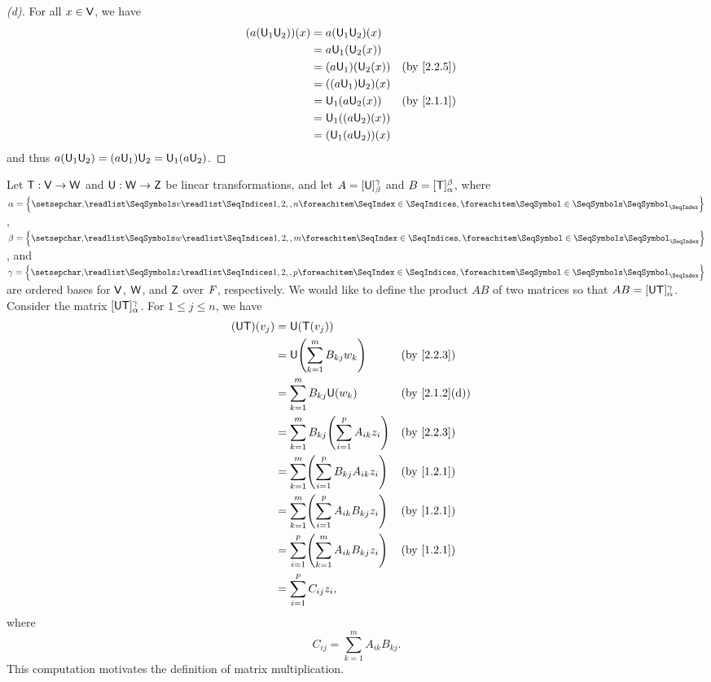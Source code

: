 \begin{proof}[(d)]
  For all \(x \in \mathsf{V}\), we have
  \begin{align*}
    (a (\U_1 \U_2))(x) & = a (\U_1 \U_2)(x)                                 \\
                       & = a \U_1(\U_2(x))                                  \\
                       & = (a \U_1)(\U_2(x))  &  & \text{(by \cref{2.2.5})} \\
                       & = ((a \U_1) \U_2)(x)                               \\
                       & = \U_1(a \U_2(x))    &  & \text{(by \cref{2.1.1})} \\
                       & = \U_1((a \U_2)(x))                                \\
                       & = (\U_1 (a \U_2))(x)
  \end{align*}
  and thus \(a (\mathsf{U}_1 \mathsf{U}_2) = (a \mathsf{U}_1) \mathsf{U}_2 = \mathsf{U}_1 (a \mathsf{U}_2)\).
\end{proof}

\begin{note}
  Let \(\mathsf{T} : \mathsf{V} \to \mathsf{W}\) and \(\mathsf{U} : \mathsf{W} \to \mathsf{Z}\) be linear transformations, and let \(A = [\mathsf{U}]_{\beta}^{\gamma}\) and \(B = [\mathsf{T}]_{\alpha}^{\beta}\), where \(\alpha = \set{\seq{v}{1,2,,n}}\), \(\beta = \set{\seq{w}{1,2,,m}}\), and \(\gamma = \set{\seq{z}{1,2,,p}}\) are ordered bases for \(\mathsf{V}\), \(\mathsf{W}\), and \(\mathsf{Z}\) over \(\mathit{F}\), respectively.
  We would like to define the product \(AB\) of two matrices so that \(AB = [\mathsf{U} \mathsf{T}]_{\alpha}^{\gamma}\).
  Consider the matrix \([\mathsf{U} \mathsf{T}]_{\alpha}^{\gamma}\).
  For \(1 \leq j \leq n\), we have
  \begin{align*}
    (\U \T)(v_j) & = \U(\T(v_j))                                                                              \\
                 & = \U\pa{\sum_{k = 1}^m B_{k j} w_k}                       &  & \text{(by \cref{2.2.3})}    \\
                 & = \sum_{k = 1}^m B_{k j} \U(w_k)                          &  & \text{(by \cref{2.1.2}(d))} \\
                 & = \sum_{k = 1}^m B_{k j} \pa{\sum_{i = 1}^p A_{i k} z_i}  &  & \text{(by \cref{2.2.3})}    \\
                 & = \sum_{k = 1}^m \pa{\sum_{i = 1}^p B_{k j}  A_{i k} z_i} &  & \text{(by \cref{1.2.1})}    \\
                 & = \sum_{k = 1}^m \pa{\sum_{i = 1}^p A_{i k} B_{k j} z_i}  &  & \text{(by \cref{1.2.1})}    \\
                 & = \sum_{i = 1}^p \pa{\sum_{k = 1}^m A_{i k} B_{k j} z_i}  &  & \text{(by \cref{1.2.1})}    \\
                 & = \sum_{i = 1}^p C_{i j} z_i,
  \end{align*}
  where
  \[
    C_{i j} = \sum_{k = 1}^m A_{i k} B_{k j}.
  \]
  This computation motivates the definition of matrix multiplication.
\end{note}

